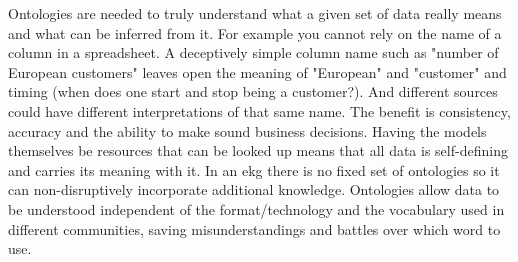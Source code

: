 %
%
Ontologies are needed to truly understand what a given set of data really means and what can be inferred from it.
For example you cannot rely on the name of a column in a spreadsheet.
A deceptively simple column name such as "number of European customers" leaves open the meaning of
"European" and "customer" and timing (when does one start and stop being a customer?).
And different sources could have different interpretations of that same name.
The benefit is consistency, accuracy and the ability to make sound business decisions.
Having the models themselves be resources that can be looked up means that all data is self-defining and
carries its meaning with it.
In an \gls{ekg} there is no fixed set of ontologies so it can non-disruptively incorporate additional knowledge.
Ontologies allow data to be understood independent of the format/technology and the vocabulary used in
different communities, saving misunderstandings and battles over which word to use.

